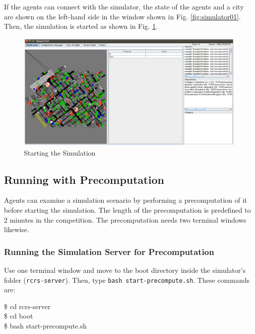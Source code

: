 \documentclass[a4paper]{article}
\begin{document}
If the agents can connect with the simulator, the state of the agents and a city are shown on the left-hand side in the window shown in Fig. \ref{fig:simulator01}. Then, the simulation is started as shown in Fig. \ref{fig:simulator02}.

\begin{figure}[h]
 \begin{center}
  \includegraphics[width=1.0\linewidth]{figs/simulator02.eps}
  \caption{Starting the Simulation}
  \label{fig:simulator02}
 \end{center}
\end{figure}
\subsection{Running with Precomputation}
Agents can examine a simulation scenario by performing a precomputation of it before starting the simulation. The length of the precomputation is predefined to 2 minutes in the competition. The precomputation needs two terminal windows likewise.
\subsubsection{Running the Simulation Server for Precomputation}
Use one terminal window and move to the boot directory inside the simulator's folder (\texttt{rcrs-server}). Then, type \texttt{bash start-precompute.sh}. These commands are:

\begin{center}
   \begin{tcolorbox}[title=Running Simulation Server, width=.98\linewidth]
    {\ttfamily
    \$ cd rcrs-server\\
    \$ cd boot\\
    \$ bash start-precompute.sh
    }
  \end{tcolorbox}
\end{center}
\end{document}
